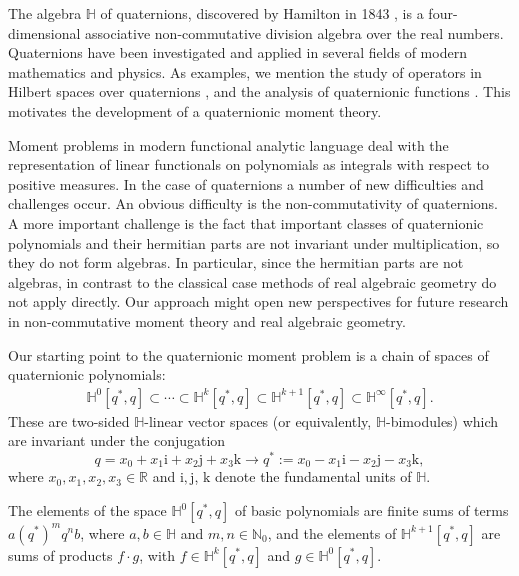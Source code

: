 \documentclass[11pt,a4paper]{amsart}
\theoremstyle{definition}
\begin{document}
The algebra $\mathbb{H}$ of quaternions, discovered by Hamilton in 1843
\cite{Hamilton1843}, is a four-dimensional associative non-commutative
division algebra over the real numbers. Quaternions have been investigated
and applied in several fields of modern mathematics and physics. As examples,
we mention the study of operators in Hilbert spaces over quaternions
\cite{CGK}, \cite{vasi22} and the analysis of quaternionic functions
\cite{GSS}. This motivates the development of a quaternionic moment theory.

Moment problems in modern functional analytic language deal with the representation
of linear functionals on polynomials as integrals with respect to positive
measures. In the case of quaternions a number of new difficulties and challenges
occur. An obvious difficulty is the non-commutativity of quaternions. A
more important challenge is the fact that important classes of quaternionic
polynomials and their hermitian parts are not invariant under multiplication,
so they do not form algebras. In particular, since the hermitian parts
are not algebras, in contrast to the classical case methods of real algebraic
geometry do not apply directly. Our approach might open new perspectives
for future research in non-commutative moment theory and real algebraic
geometry.

Our starting point to the quaternionic moment problem is a chain of spaces
of quaternionic polynomials:
%
\begin{align}
\mathbb{H}^{0}[q^{*}, q]\subset \cdots \subset \mathbb{H}^{k}[q^{*}, q]
\subset \mathbb{H}^{k+1}[q^{*}, q]\subset \mathbb{H}^{\infty}[q^{*}, q].
\label{eq1}
\end{align}
%
These are two-sided $\mathbb{H}$-linear vector spaces (or equivalently,
$\mathbb{H}$-bimodules) which are invariant under the conjugation
%
\begin{equation*}
q = x_{0} + x_{1} \mathrm{i}+ x_{2} \mathrm{j}+ x_{3} \mathrm{k}\to q^{*}:=x_{0}-x_{1}
\mathrm{i}-x_{2}\mathrm{j}-x_{3}\mathrm{k},
\end{equation*}
%
where $x_{0}, x_{1}, x_{2}, x_{3} \in \mathbb{R}$ and
$\mathrm{i}, \mathrm{j}$, $\mathrm{k}$ denote the fundamental units of
$\mathbb{H}$.

The elements of the space $\mathbb{H}^{0}[q^{*}, q]$ of basic polynomials
are finite sums of terms $a(q^{*})^{m}q^{n}b$, where
$a,b \in \mathbb{H}$ and $m,n\in \mathbb{N}_{0}$, and the elements of
$ \mathbb{H}^{k+1}[q^{*}, q]$ are sums of products $f\cdot g$, with
$f\in \mathbb{H}^{k}[q^{*}, q]$ and $g\in \mathbb{H}^{0}[q^{*}, q]$.
\end{document}
